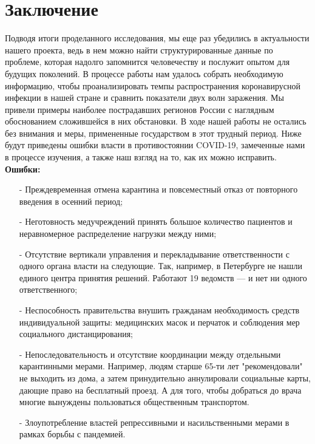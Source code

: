 \documentclass[a4paper, 12pt]{extarticle}
\begin{document}
\section{Заключение}
Подводя итоги проделанного исследования, мы еще раз убедились в актуальности нашего проекта, ведь в нем можно найти структурированные данные по проблеме, которая надолго запомнится человечеству и послужит опытом для будущих поколений.  В процессе работы нам удалось собрать необходимую информацию, чтобы проанализировать темпы распространения коронавирусной инфекции в нашей стране и сравнить показатели двух волн заражения. Мы привели примеры наиболее пострадавших регионов России с наглядным обоснованием сложившейся в них обстановки.  В ходе нашей работы не остались без внимания и меры, примененные государством в этот трудный период. Ниже будут приведены ошибки власти в противостоянии COVID-19, замеченные нами в процессе изучения, а также наш взгляд на то, как их можно исправить.
\\

\textbf{Ошибки:}
\begin{itemize}
    \item[-] Преждевременная отмена карантина и повсеместный отказ от повторного введения в осенний период;

    \item[-] Неготовность медучреждений принять большое количество пациентов и неравномерное распределение нагрузки между ними;

    \item[-] Отсутствие вертикали управления и перекладывание ответственности с одного органа власти на следующие. Так, например, в Петербурге не нашли единого центра принятия решений. Работают 19 ведомств — и нет ни одного ответственного;

    \item[-] Неспособность правительства внушить гражданам необходимость средств индивидуальной защиты: медицинских масок и перчаток и соблюдения мер социального дистанцирования;

    \item[-] Непоследовательность и отсутствие координации между отдельными карантинными мерами.  Например, людям старше 65-ти лет "рекомендовали" не выходить из дома, а затем принудительно аннулировали социальные карты, дающие право на бесплатный проезд. А для того, чтобы добраться до врача многие вынуждены пользоваться общественным транспортом.

    \item[-] Злоупотребление властей репрессивными и насильственными мерами в рамках борьбы с пандемией.

\end{itemize}
\end{document}

